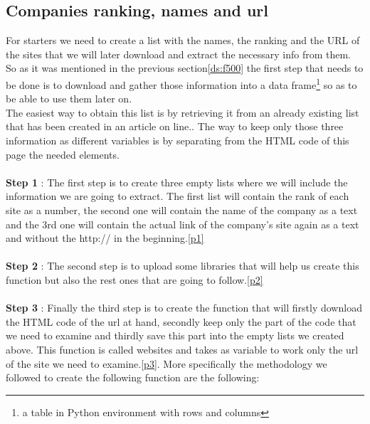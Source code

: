 \documentclass{book}
\begin{document}
\subsection{Companies ranking, names and url}
For starters we need to create a list with the names, the ranking and the URL of the sites that we will later download and extract the necessary info from them. So as it was mentioned in the previous section\ref{ds:f500} the first step that needs to be done is to download and gather those information into a data frame\footnote{a table in Python environment with rows and columns} so as to be able to use them later on.\\
The easiest way to obtain this list is by retrieving it from an already existing list that has been created in an article on line.\cite{key33}. The way to keep only those three information as different variables is by separating from the HTML code of this page the needed elements.\\\\
\textbf{Step 1} : The first step is to create three empty lists where we will include the information we are going to extract. The first list will contain the rank of each site as a number, the second one will contain the name of the company as a text and the 3rd one will contain the actual link of the company's site again as a text and without the http:// in the beginning.\ref{p1}\\\\
\textbf{Step 2} : The second step is to upload some libraries that will help us create this function but also the rest ones that are going to follow.\ref{p2}\\\\
\textbf{Step 3} : Finally the third step is to create the function that will firstly download the HTML code of the url at hand, secondly keep only the part of the code that we need to examine and thirdly save this part into the empty lists we created above. This function is called websites and takes as variable to work only the url of the site we need to examine.\ref{p3}. More specifically the methodology we followed to create the following function are the following:
\end{document}
